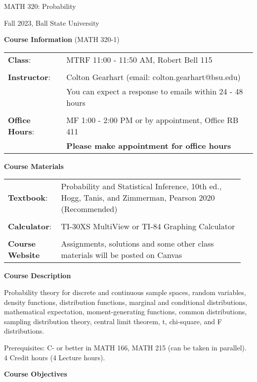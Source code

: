 \documentclass{article}
\begin{document}
\begin{center}
\Huge{MATH 320: Probability}

\large{Fall 2023, Ball State University}
\end{center}

\bigskip\bigskip

\textbf{\large Course Information} (MATH 320-1)\medskip

\begin{tabular}{ll}
    \textbf{Class}: & MTRF 11:00 - 11:50 AM, Robert Bell 115\\\\
    \textbf{Instructor}: & Colton Gearhart (email: colton.gearhart@bsu.edu) \\
     & You can expect a response to emails within 24 - 48 hours \\\\
    \textbf{Office Hours}: & MF 1:00 - 2:00 PM or by appointment, Office RB 411 \\
     & \textbf{Please make appointment for office hours}
\end{tabular}\bigskip

\textbf{\large Course Materials}\medskip

\begin{tabular}{p{0.2\linewidth}p{0.75\linewidth}}
    \textbf{Textbook}: & Probability and Statistical Inference, 10th ed., Hogg, Tanis, and Zimmerman, Pearson 2020 (Recommended)\\\\
    \textbf{Calculator}: & TI-30XS MultiView or TI-84 Graphing Calculator\\\\
    \textbf{Course Website} & Assignments, solutions and some other class materials will be posted on Canvas
\end{tabular}\bigskip

\textbf{\large Course Description}\medskip

Probability theory for discrete and continuous sample spaces, random variables, density functions, distribution functions, marginal and conditional distributions, mathematical expectation, moment-generating functions, common distributions, sampling distribution theory, central limit theorem, t, chi-square, and F distributions.

Prerequisites: C- or better in MATH 166, MATH 215 (can be taken in parallel).\\
4 Credit hours (4 Lecture hours).\bigskip

\textbf{\large Course Objectives}\medskip
\end{document}
